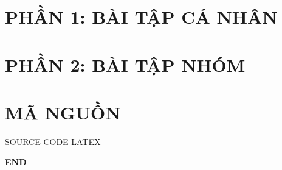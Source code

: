 \documentclass[12pt,a4paper]{article}
\begin{document}
    

    \tableofcontents

    \section*{\LARGE PHẦN 1: BÀI TẬP CÁ NHÂN}

    
    

    \section*{\LARGE PHẦN 2: BÀI TẬP NHÓM}

    

    \section*{\LARGE MÃ NGUỒN}
    \href{https://github.com/langvietthanh/BTL_KTMT.git}{SOURCE CODE LATEX}
    
    \vfill 

    \begin{center}
    \textbf{\LARGE END}
    \end{center}
\end{document}
